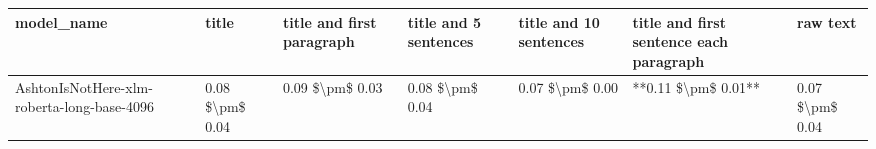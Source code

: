 \begin{tabular}{lllllll}
\toprule
                                model\_name &           title & title and first paragraph & title and 5 sentences & title and 10 sentences & title and first sentence each paragraph &        raw text \\
\midrule
AshtonIsNotHere-xlm-roberta-long-base-4096 & 0.08 \$\textbackslash pm\$ 0.04 &           0.09 \$\textbackslash pm\$ 0.03 &       0.08 \$\textbackslash pm\$ 0.04 &        0.07 \$\textbackslash pm\$ 0.00 &                     **0.11 \$\textbackslash pm\$ 0.01** & 0.07 \$\textbackslash pm\$ 0.04 \\
\bottomrule
\end{tabular}
